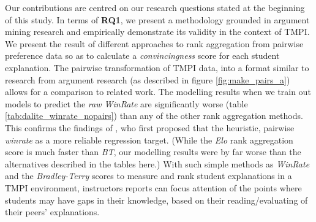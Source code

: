 \documentclass[notitlepage,12pt]{jedm}
\begin{document}
Our contributions are centred on our research questions stated at the beginning 
of this study. 
In terms of \textbf{RQ1}, we present a methodology grounded in argument mining 
research and empirically demonstrate its validity in the context of TMPI.
We present the result of different approaches to rank aggregation from pairwise 
preference data so as to calculate a \textit{convincingness} score for each 
student explanation.
The pairwise transformation of TMPI data, into a format similar to research 
from argument research (as described in figure \ref{fig:make_pairs_a}) allows 
for a comparison to related work. 
The modelling results when we train out models to predict the \textit{raw 
WinRate} are significantly worse (table \ref{tab:dalite_winrate_nopairs}) than 
any of the other rank aggregation methods.
This confirms the findings of , who first proposed 
that the heuristic, pairwise \textit{winrate} as a more reliable regression 
target.
(While the \textit{Elo} rank aggregation score is much faster than \textit{BT}, 
our modelling results were by far worse than the alternatives described in the 
tables here.)
With such simple methods as \textit{WinRate} and the \textit{Bradley-Terry} 
scores to measure and rank student explanations in a TMPI environment, 
instructors reports can focus attention of the points where students may have 
gaps in their knowledge, based on their reading/evaluating of their peers' 
explanations.
\end{document}
